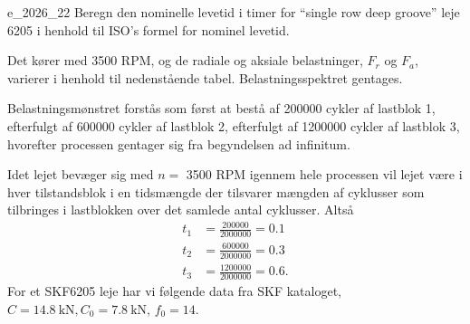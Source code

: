 
    \begin{problemwithimage}{e_2026_2}{2}
      Beregn den nominelle levetid i timer for ``single row deep groove'' leje 6205 i henhold til ISO's formel for nominel levetid.

      Det kører med 3500 RPM, og de radiale og aksiale belastninger, $F_r$ og $F_a$, varierer i henhold til nedenstående tabel.
      Belastningsspektret gentages.
    \end{problemwithimage}

    \begin{derivation}
      Belastningsmønstret forstås som først at bestå af \num{200000} cykler af lastblok 1, efterfulgt af \num{600000} cykler af lastblok 2, efterfulgt af \num{1200000} cykler af lastblok 3, hvorefter processen gentager sig fra begyndelsen ad infinitum.

      Idet lejet bevæger sig med $n = $ 3500 RPM igennem hele processen vil lejet være i hver tilstandsblok i en tidsmængde der tilsvarer mængden af cyklusser som tilbringes i lastblokken over det samlede antal cyklusser.
      Altså
      \begin{align*}
        t_1 &= \frac{\num{200000}}{\num{2000000}} = \num{0,1} \\
        t_2 &= \frac{\num{600000}}{\num{2000000}} = \num{0,3} \\
        t_3 &= \frac{\num{1200000}}{\num{2000000}} = \num{0,6} 
      .\end{align*}
    For et SKF6205 leje har vi følgende data fra SKF kataloget, $C = \qty{14,8}{\kN}, C_0 = \qty{7,8}{\kN}$, $f_0 = 14$. 


\end{derivation}
